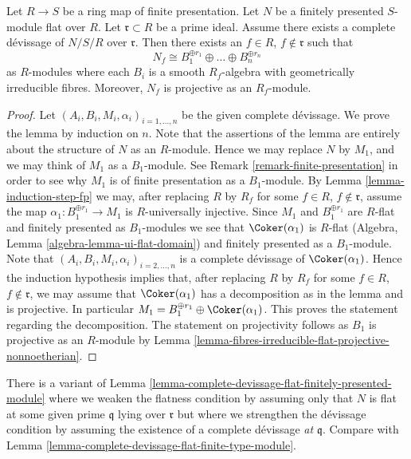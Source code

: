 \begin{lemma}
\label{lemma-complete-devissage-flat-finitely-presented-module}
Let $R \to S$ be a ring map of finite presentation.
Let $N$ be a finitely presented $S$-module flat over $R$.
Let $\mathfrak r \subset R$ be a prime ideal.
Assume there exists a complete d\'evissage of $N/S/R$ over $\mathfrak r$.
Then there exists an $f \in R$, $f \not \in \mathfrak r$
such that
$$
N_f \cong B_1^{\oplus r_1} \oplus \ldots \oplus B_n^{\oplus r_n}
$$
as $R$-modules where each $B_i$ is a smooth $R_f$-algebra with geometrically
irreducible fibres. Moreover, $N_f$ is projective as an $R_f$-module.
\end{lemma}

\begin{proof}
Let $(A_i, B_i, M_i, \alpha_i)_{i = 1, \ldots, n}$ be the given
complete d\'evissage. We prove the lemma by induction on $n$.
Note that the assertions of the lemma are entirely about the structure
of $N$ as an $R$-module. Hence we may replace $N$ by $M_1$, and we
may think of $M_1$ as a $B_1$-module. See
Remark \ref{remark-finite-presentation}
in order to see why $M_1$ is of finite presentation as a $B_1$-module. By
Lemma \ref{lemma-induction-step-fp}
we may, after replacing $R$ by $R_f$ for some
$f \in R$, $f \not \in \mathfrak r$, assume
the map $\alpha_1 : B_1^{\oplus r_1} \to M_1$ is $R$-universally injective.
Since $M_1$ and $B_1^{\oplus r_1}$ are $R$-flat and finitely presented as
$B_1$-modules we see that $\Coker(\alpha_1)$ is $R$-flat
(Algebra, Lemma \ref{algebra-lemma-ui-flat-domain})
and finitely presented as a $B_1$-module. Note that
$(A_i, B_i, M_i, \alpha_i)_{i = 2, \ldots, n}$ is a complete
d\'evissage of $\Coker(\alpha_1)$. Hence the induction hypothesis
implies that, after replacing
$R$ by $R_f$ for some $f \in R$, $f \not \in \mathfrak r$,
we may assume that $\Coker(\alpha_1)$ has a decomposition
as in the lemma and is projective. In particular
$M_1 = B_1^{\oplus r_1} \oplus \Coker(\alpha_1)$.
This proves the statement regarding the decomposition.
The statement on projectivity follows as $B_1$ is projective as
an $R$-module by
Lemma \ref{lemma-fibres-irreducible-flat-projective-nonnoetherian}.
\end{proof}

\begin{remark}
\label{remark-complete-devissage-flat-finitely-presented-module}
There is a variant of
Lemma \ref{lemma-complete-devissage-flat-finitely-presented-module}
where we weaken the flatness condition by assuming only that $N$
is flat at some given prime $\mathfrak q$ lying over $\mathfrak r$
but where we strengthen the d\'evissage condition by assuming
the existence of a complete d\'evissage {\it at $\mathfrak q$}. Compare with
Lemma \ref{lemma-complete-devissage-flat-finite-type-module}.
\end{remark}

